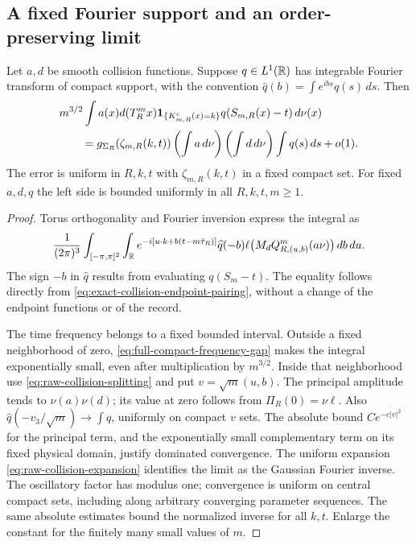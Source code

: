 \subsection{A fixed Fourier support and an order-preserving limit}
\begin{lemma}
\label{lem:bandlimited-collision-local}
Let $a,d$ be smooth collision functions. Suppose $q\in L^1(\mathbb R)$
has integrable Fourier transform of compact support, with the convention
$\widehat q(b)=\int e^{ibs}q(s)\,ds$. Then
\begin{align}
 &m^{3/2}\int a(x)d(T_R^m x)
   \one_{\{K^{\rm c}_{m,R}(x)=k\}}q(S_{m,R}(x)-t)\,d\nu(x)
 \notag\\
 &\qquad =g_{\Sigma_R}(\zeta_{m,R}(k,t))
             \left(\int a\,d\nu\right)
             \left(\int d\,d\nu\right)\int q(s)\,ds+o(1).
 \label{eq:bandlimited-collision-local}
\end{align}
The error is uniform in $R,k,t$ with $\zeta_{m,R}(k,t)$ in a fixed
compact set. For fixed $a,d,q$ the left side is bounded uniformly
in all $R,k,t,m\ge1$.
\end{lemma}
\begin{proof}
Torus orthogonality and Fourier inversion express the integral as
\begin{equation}\label{eq:bandlimited-collision-pairing}
 \frac1{(2\pi)^3}\int_{[-\pi,\pi]^2}\int_\R
 e^{-i[u\cdot k+b(t-m\bar\tau_R)]}\widehat q(-b)
 \ell\bigl(M_d Q_{R,(u,b)}^m(a\nu)\bigr)\,db\,du.
\end{equation}
The sign $-b$ in $\widehat q$ results from evaluating $q(S_m-t)$.
The equality follows directly from
\eqref{eq:exact-collision-endpoint-pairing}, without a change of the
endpoint functions or of the record.

The time frequency belongs to a fixed bounded interval. Outside a
fixed neighborhood of zero,
\eqref{eq:full-compact-frequency-gap} makes the integral exponentially
small, even after multiplication by $m^{3/2}$. Inside that neighborhood
use \eqref{eq:raw-collision-splitting} and put $v=\sqrt m(u,b)$.
The principal amplitude tends to $\nu(a)\nu(d)$; its value at zero
follows from $\Pi_R(0)=\nu\ell$. Also
$\widehat q(-v_3/\sqrt m)\to\int q$, uniformly on compact $v$ sets.
The absolute bound $C e^{-c|v|^2}$ for the principal term, and the
exponentially small complementary term on its fixed physical domain,
justify dominated convergence. The uniform expansion
\eqref{eq:raw-collision-expansion} identifies the limit as the Gaussian
Fourier inverse. The oscillatory factor has modulus one; convergence
is uniform on central compact sets, including along arbitrary
converging parameter sequences. The same absolute estimates bound the
normalized inverse for all $k,t$. Enlarge the constant for the
finitely many small values of $m$.
\end{proof}

